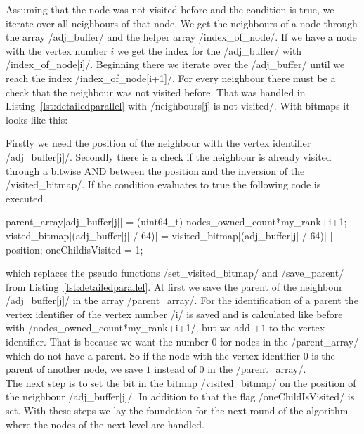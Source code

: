 \documentclass[12pt,a4paper]{article}
\begin{document}
Assuming that the node was not visited before and the condition is true, we iterate over all neighbours of that node. We get the neighbours of a node through the array \cinline/adj_buffer/ and the helper array \cinline/index_of_node/. If we have a node with the vertex number \(i\) we get the index for the \cinline/adj_buffer/ with \cinline/index_of_node[i]/. Beginning there we iterate over the \cinline/adj_buffer/ until we reach the index \cinline/index_of_node[i+1]/. 
For every neighbour there must be a check that the neighbour was not visited before. That was handled in Listing~\ref{lst:detailedparallel} with \cinline/neighbours[j] is not visited/. With bitmaps it looks like this:
\begin{ccode}
position = (uint64_t) pow(2, (adj_buffer[j] %
if (position & ~visited_bitmap[(adj_buffer[j] / 64)]){
\end{ccode}
Firstly we need the position of the neighbour with the vertex identifier \cinline/adj_buffer[j]/. Secondly there is a check if the neighbour is already visited through a bitwise AND between the position and the inversion of the \cinline/visited_bitmap/.
If the condition evaluates to true the following code is executed
\begin{ccode}
parent_array[adj_buffer[j]] = (uint64_t) nodes_owned_count*my_rank+i+1;
visted_bitmap[(adj_buffer[j] / 64)] = visited_bitmap[(adj_buffer[j] / 64)] | position;
oneChildisVisited = 1;
\end{ccode}
which replaces the pseudo functions \cinline/set_visited_bitmap/ and \cinline/save_parent/ from Listing~\ref{lst:detailedparallel}. At first we save the parent of the neighbour \cinline/adj_buffer[j]/ in the array \cinline/parent_array/. For the identification of a parent the vertex identifier of the vertex number \cinline/i/ is saved and is calculated like before with \cinline/nodes_owned_count*my_rank+i+1/, but we add \(+1\) to the vertex identifier. That is because we want the number \(0\) for nodes in the \cinline/parent_array/ which do not have a parent. So if the node with the vertex identifier \(0\) is the parent of another node, we save \(1\) instead of \(0\) in the \cinline/parent_array/.\\
The next step is to set the bit in the bitmap \cinline/visited_bitmap/ on the position of the neighbour \cinline/adj_buffer[j]/. In addition to that the flag \cinline/oneChildIsVisited/ is set. With these steps we lay the foundation for the next round of the algorithm where the nodes of the next level are handled.\\
\end{document}
